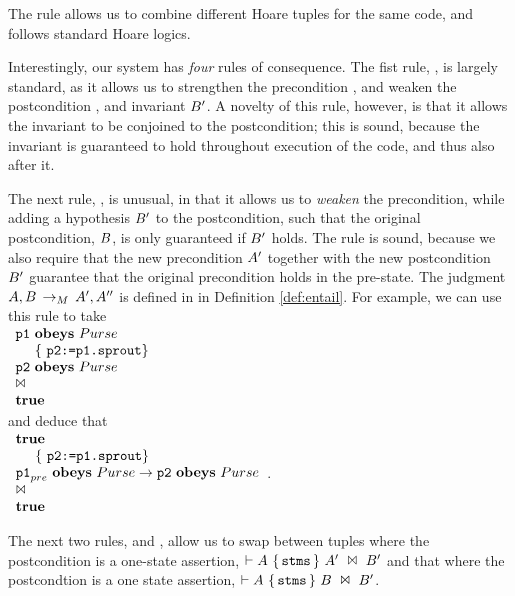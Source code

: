 The rule   allows us to combine different Hoare tuples for the same code, and follows standard Hoare logics.

 Interestingly, our system has {\em four} rules of consequence. The fist rule, , is largely standard, as it allows us to strengthen the precondition \A, and weaken the postcondition \B, and invariant $B'$. A novelty of this rule, however, is that it allows the invariant to be conjoined to the postcondition; this is sound, because the invariant is guaranteed to hold throughout execution of the code, and thus also after it. 



 The next rule,   , is unusual, in that it allows us to {\em weaken} the precondition, while adding a hypothesis $B'$ to the postcondition, such that the original postcondition, $B$, is only guaranteed if $B'$ holds. The rule is sound, because we also require that the new precondition $A'$ together with the new postcondition $B'$ guarantee that the original precondition holds in the pre-state.   
The judgment $A,B\, \rightarrow_M\, A',A''$ is defined in  in Definition \ref{def:entail}. 
For example, we can use this rule to take\\
$\begin{array}{l} {\ensuremath{\textrm{\ttfamily{p1}}}}\, \,\textbf{\textrm{obeys}}\,\, Purse\\ ~ { ~ } {\hspace{.1in}} \{\ {\textrm{\ttfamily{p2:=p1.sprout}}} \} \\ {\textrm{\ttfamily{p2}}}\, \,\textbf{\textrm{obeys}}\,\, Purse \\ \Join\\ {\bf {true}} \end{array} $\\ and deduce that\\
$\begin{array}{l} {\bf {true}}\\ ~ { ~ } {\hspace{.1in}} \{\ {\textrm{\ttfamily{p2:=p1.sprout}}} \} \\ {\textrm{\ttfamily{p1}}}_{{pre}}\, \,\textbf{\textrm{obeys}}\,\, Purse \rightarrow {\ensuremath{\textrm{\ttfamily{p2}}}}\, \,\textbf{\textrm{obeys}}\,\, Purse \\ \Join\\ {\bf {true}} \end{array} $.

The next two rules,  and , allow us to swap between tuples
 where the postcondition is a one-state assertion, \ie ${\vdash {\ensuremath {A}}\ \{\, {{\textrm{\ttfamily{stms}}}}\, \}\ {A'}\ \Join\ {B'} }$ and
that where the postcondtion is a one state assertion, \ie ${\vdash {\ensuremath {A}}\ \{\, {{\textrm{\ttfamily{stms}}}}\, \}\ {B}\ \Join\ {B'} }$. 








